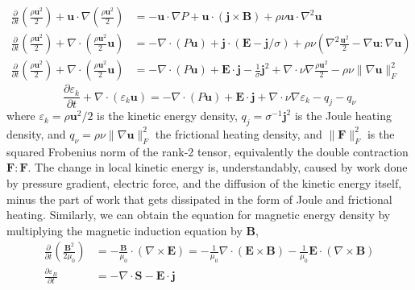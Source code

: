 \begin{equation}
\begin{aligned}
    \frac{\partial}{\partial t} \left(\frac{\rho \mathbf{u}^2}{2}\right) + \mathbf{u}\cdot \nabla \left(\frac{\rho \mathbf{u}^2}{2}\right) &= - \mathbf{u}\cdot \nabla P + \mathbf{u}\cdot (\mathbf{j}\times \mathbf{B}) + \rho \nu \mathbf{u}\cdot \nabla^2 \mathbf{u} \\ 
    \frac{\partial}{\partial t} \left(\frac{\rho \mathbf{u}^2}{2}\right) + \nabla \cdot \left(\frac{\rho \mathbf{u}^2}{2} \mathbf{u}\right) &= - \nabla\cdot (P \mathbf{u}) + \mathbf{j}\cdot (\mathbf{E} - \mathbf{j}/\sigma) + \rho \nu \left(\nabla^2 \frac{\mathbf{u}^2}{2} - \nabla \mathbf{u} : \nabla\mathbf{u}\right) \\ 
    \frac{\partial}{\partial t} \left(\frac{\rho \mathbf{u}^2}{2}\right) + \nabla \cdot \left(\frac{\rho \mathbf{u}^2}{2} \mathbf{u}\right) &= - \nabla\cdot (P \mathbf{u}) + \mathbf{E}\cdot \mathbf{j} - \frac{1}{\sigma} \mathbf{j}^2 + \nabla\cdot \nu \nabla \frac{\rho\mathbf{u}^2}{2} - \rho \nu \|\nabla \mathbf{u}\|_F^2
\end{aligned}
\end{equation}
%
\begin{equation}\label{eqn:kinetic-energy-density}
    \frac{\partial \varepsilon_k}{\partial t} + \nabla\cdot (\varepsilon_k \mathbf{u}) = - \nabla\cdot (P \mathbf{u}) + \mathbf{E}\cdot \mathbf{j} + \nabla\cdot \nu \nabla \varepsilon_k - q_j - q_\nu
\end{equation}
%
where $\varepsilon_k = \rho \mathbf{u}^2 /2$ is the kinetic energy density, $q_j = \sigma^{-1} \mathbf{j}^2$ is the Joule heating density, and $q_\nu = \rho \nu \|\nabla\mathbf{u}\|_F^2$ the frictional heating density, and $\|\mathbf{F}\|_F^2$ is the squared Frobenius norm of the rank-2 tensor, equivalently the double contraction $\mathbf{F}:\mathbf{F}$. The change in local kinetic energy is, understandably, caused by work done by pressure gradient, electric force, and the diffusion of the kinetic energy itself, minus the part of work that gets dissipated in the form of Joule and frictional heating. Similarly, we can obtain the equation for magnetic energy density by multiplying the magnetic induction equation by $\mathbf{B}$,
%
\begin{equation}\label{eqn:magnetic-energy-density}
\begin{aligned}
    \frac{\partial}{\partial t} \left(\frac{\mathbf{B}^2}{2\mu_0}\right) &= - \frac{\mathbf{B}}{\mu_0}\cdot (\nabla\times \mathbf{E}) = - \frac{1}{\mu_0} \nabla\cdot (\mathbf{E}\times \mathbf{B}) - \frac{1}{\mu_0} \mathbf{E}\cdot (\nabla\times \mathbf{B}) \\ 
    \frac{\partial \varepsilon_B}{\partial t} &= - \nabla\cdot \mathbf{S} - \mathbf{E}\cdot \mathbf{j}
\end{aligned}
\end{equation}
